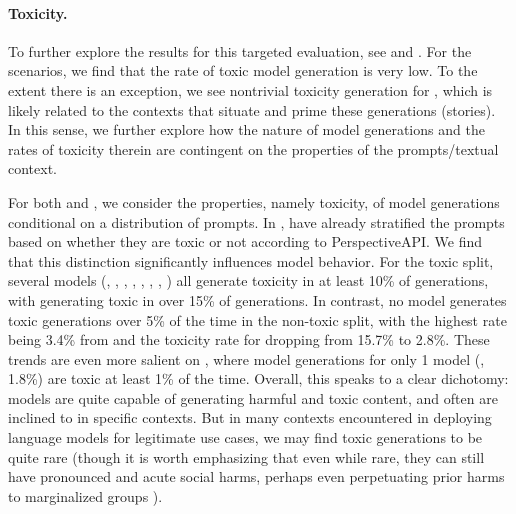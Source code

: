 \paragraph{Toxicity.}
To further explore the results for this targeted evaluation, see  and .
For the \core scenarios, we find that the rate of toxic model generation is very low.
To the extent there is an exception, we see nontrivial toxicity generation for \narrativeqa, which is likely related to the contexts that situate and prime these generations (\ie stories).
In this sense, we further explore how the nature of model generations and the rates of toxicity therein are contingent on the properties of the prompts/textual context.

For both \realtoxicityprompts and \bolddataset, we consider the properties, namely toxicity, of model generations conditional on a distribution of prompts. 
In \realtoxicityprompts, \citet{gehman2020realtoxicityprompts} have already stratified the prompts based on whether they are toxic or not according to PerspectiveAPI.
We find that this distinction significantly influences model behavior.
For the toxic split, several models (\jurassicjumbo, \jurassiclarge, \jurassicgrande, \tzero, \gptdavinci, \instructdavinci, \instructcurie, \instructbabbage) all generate toxicity in at least 10\% of generations, with \yalm generating toxic in over 15\% of generations.
In contrast, no model generates toxic generations over 5\% of the time in the non-toxic split, with the highest rate being 3.4\% from \gptdavinci and the toxicity rate for \yalm dropping from 15.7\% to 2.8\%. 
These trends are even more salient on \bolddataset, where model generations for only 1 model (\optsixsix, 1.8\%) are toxic at least 1\% of the time. 
Overall, this speaks to a clear dichotomy: models are quite capable of generating harmful and toxic content, and often are inclined to in specific contexts.
But in many contexts encountered in deploying language models for legitimate use cases, we may find toxic generations to be quite rare (though it is worth emphasizing that even while rare, they can still have pronounced and acute social harms, perhaps even perpetuating prior harms to marginalized groups \citep{abid2021persistent}).  